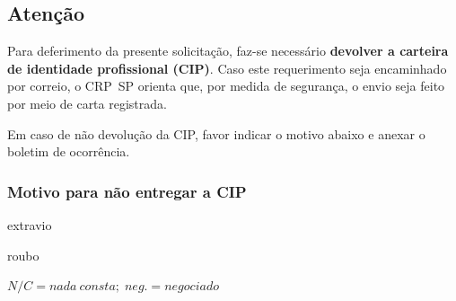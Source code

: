 \documentclass[openright, oneside, a4paper, article, brazil]{abntex2}
\begin{document}
\begin{framed}\small
	\begin{minipage}{\linewidth-1.5\boxlarg}
		\subsection{Atenção}

		Para deferimento da presente solicitação, faz-se necessário \textbf{devolver a carteira de identidade profissional (CIP)}. Caso este requerimento seja encaminhado por correio, o CRP~SP orienta que, por medida de segurança, o envio seja feito por meio de carta registrada.

		Em caso de não devolução da CIP, favor indicar o motivo abaixo e anexar o boletim de ocorrência.
	\end{minipage}%
	\begin{minipage}[t]{0.5\boxlarg}
		\hfill{\null}
	\end{minipage}
	\vspace{\baselineskip}

	\begin{minipage}[t]{0.3\textwidth}
		\subsubsection{Motivo para não entregar a CIP}

		\normalfont\raggedright\small\setasuspacing{\DoubleSpacing}
		\begin{minipage}[t]{\boxlarg}
		\end{minipage}%
		\begin{minipage}[t]{\linewidth-\boxlarg}\small
			extravio
		\end{minipage}

		\begin{minipage}[t]{\boxlarg}
		\end{minipage}%
		\begin{minipage}[t]{\linewidth-\boxlarg}\small
			roubo
		\end{minipage}
	\end{minipage}%
	\hspace{\fill}
	\begin{minipage}[t]{0.358\textwidth}%
		\normalfont\raggedleft\scriptsize\setasuspacing{\DoubleSpacing}
		\begin{framed}





			$N/C = nada\: consta;\; neg. = negociado$
			\vspace*{1ex}


		\end{framed}
		\vfill
	\end{minipage}
\end{framed}
\end{document}
